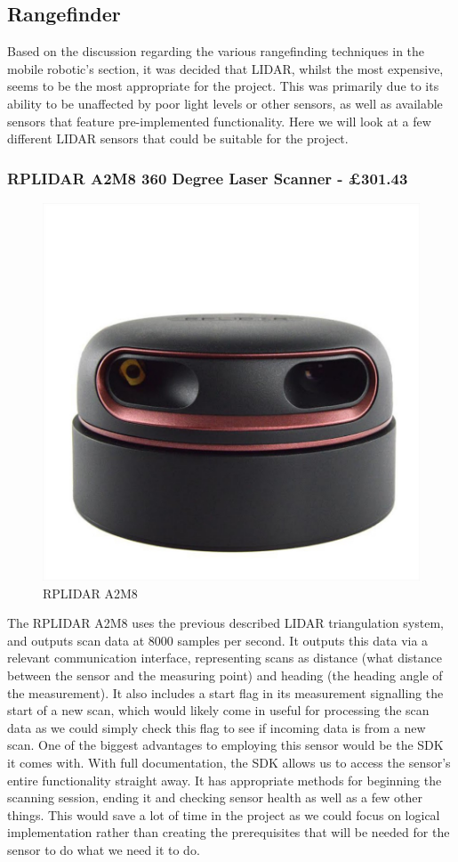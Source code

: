 				\subsection{Rangefinder}
				Based on the discussion regarding the various rangefinding techniques in the mobile robotic's section, it was decided that LIDAR, whilst the most expensive, seems to be the most appropriate for the project. This was primarily due to its ability to be unaffected by poor light levels or other sensors, as well as available sensors that feature pre-implemented functionality. Here we will look at a few different LIDAR sensors that could be suitable for the project.
				
					\subsubsection{RPLIDAR A2M8 360 Degree Laser Scanner - \pounds{301.43}}
					\begin{figure}[h]
						\centering
						\includegraphics[width=.3\linewidth]{ANALYSIS/rplidara2.jpg}
						\caption{RPLIDAR A2M8}
						\label{fig:rplidara2m8}
					\end{figure}
					The RPLIDAR A2M8 uses the previous described LIDAR triangulation system, and outputs scan data at 8000 samples per second\citep{rplidarm8docs}. It outputs this data via a relevant communication interface, representing scans as distance (what distance between the sensor and the measuring point) and heading (the heading angle of the measurement). It also includes a start flag in its measurement signalling the start of a new scan, which would likely come in useful for processing the scan data as we could simply check this flag to see if incoming data is from a new scan. One of the biggest advantages to employing this sensor would be the SDK it comes with. With full documentation, the SDK allows us to access the sensor's entire functionality straight away. It has appropriate methods for beginning the scanning session, ending it and checking sensor health as well as a few other things. This would save a lot of time in the project as we could focus on logical implementation rather than creating the prerequisites that will be needed for the sensor to do what we need it to do.
					
